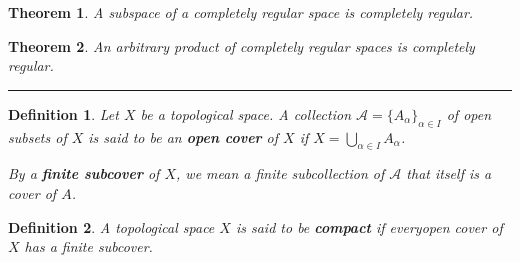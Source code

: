 \documentclass[14pt,twoside]{extreport}
\newcommand{\hhrule}{\vspace{1cm}\hrule\vspace{1cm}}
\theoremstyle{dotless}
\newtheorem*{defn}{Definition}
\newtheorem*{thm}{Theorem} %
\begin{document}
\begin{thm}
    A subspace of a completely regular space is completely regular.
\end{thm}

\begin{thm}
    An arbitrary product of completely regular spaces is completely regular.
\end{thm}

\hhrule

\begin{defn}
    Let $X$ be a topological space. A collection $\mathscr{A} = \{ A_\alpha \}_{\alpha \in I}$ of open subsets of $X$ is said to be an \textbf{open cover} of $X$ if $X = \bigcup_{\alpha \in I} A_\alpha$.


    By a \textbf{finite subcover} of $X$, we mean a finite subcollection of $\mathscr{A}$ that itself is a cover of $A$.
\end{defn}

\begin{defn}
    A topological space $X$ is said to be \textbf{compact} if everyopen cover of $X$ has a finite subcover.
\end{defn}
\end{document}
